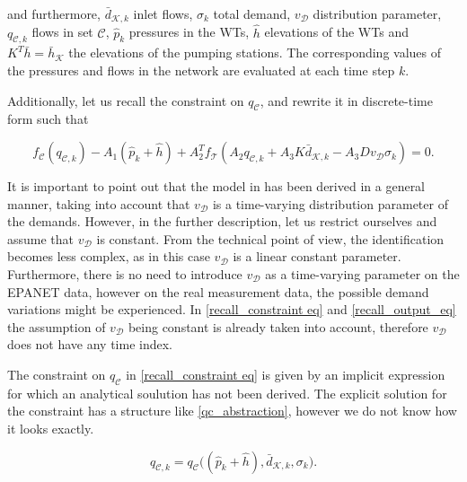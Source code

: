 and furthermore, $\bar{d}_{\mathcal{K},k}$ inlet flows, $\sigma_k$ total demand, $v_{\mathcal{D}}$ distribution parameter, $q_{\mathcal{C},k}$ flows in set $\mathcal{C}$, $\hat{p}_k$ pressures in the WTs, $\hat{h}$ elevations of the WTs and $K^T\bar{h} = \bar{h}_{\mathcal{K}} $ the elevations of the pumping stations. The corresponding values of the pressures and flows in the network are evaluated at each time step $k$. 

Additionally, let us recall the constraint on $q_\mathcal{C}$, and rewrite it in discrete-time form such that

 \begin{equation}
\label{recall_constraint eq}
f_{\mathcal{C}}(q_{\mathcal{C},k}) - A_1(\hat{p}_k + \hat{h}) + A_2^T f_{\mathcal{T}}(A_2 q_{\mathcal{C},k} + A_3 K \bar{d}_{\mathcal{K},k} - A_3 D v_{\mathcal{D}} \sigma_k) = 0.
\end{equation} 

It is important to point out that the model in  has been derived in a general manner, taking into account that $v_{\mathcal{D}}$ is a time-varying distribution parameter of the demands. However, in the further description, let us restrict ourselves and assume that $v_{\mathcal{D}}$ is constant.  From the technical point of view, the identification becomes less complex, as in this case $v_{\mathcal{D}}$ is a linear constant parameter. Furthermore, there is no need to introduce $v_{\mathcal{D}}$ as a time-varying parameter on the EPANET data, however on the real measurement data, the possible demand variations might be experienced. In \eqref{recall_constraint eq} and \eqref{recall_output_eq} the assumption of $v_{\mathcal{D}}$ being constant is already taken into account, therefore $v_{\mathcal{D}}$ does not have any time index.


The constraint on $q_\mathcal{C}$ in \eqref{recall_constraint eq} is given by an implicit expression for which an analytical soulution has not been derived. The explicit solution for the constraint has a structure like \eqref{qc_abstraction}, however we do not know how it looks exactly.

 \begin{equation}
\label{qc_abstraction}
q_{\mathcal{C},k} = q_\mathcal{C} \big( (\hat{p}_k + \hat{h}),\bar{d}_{\mathcal{K},k}, \sigma_k\big).
\end{equation} 

